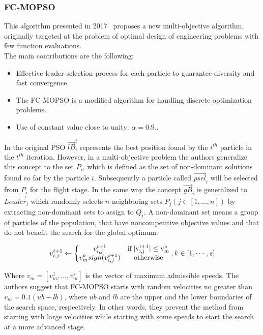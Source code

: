 \subsubsection{FC-MOPSO}

This algorithm presented in 2017~\cite{mokarram2018new} proposes a new multi-objective algorithm, originally targeted at the problem of optimal design of engineering problems with few function evaluations.\\
The main contributions are the following:
\begin{itemize}
    \item Effective leader selection process for each particle to guarantee diversity and fast convergence.
    \item The FC-MOPSO is a modified algorithm for handling discrete optimization problems.
    \item Use of constant value close to unity: $\alpha = 0.9.$.
\end{itemize}
In the original PSO $\vec{lB}_i^t$ represents the best position found by the $i^{th}$ particle in the $t^{th}$ iteration. However, in a multi-objective problem the authors generalize this concept to the set $P_i$, which is defined as the set of non-dominant solutions found so far by the particle $i$. Subsequently a particle called $\vec{psel}_i$ will be selected from $P_i$ for the flight stage. In the same way the concept $\vec{gB}_i$ is generalized to $\vec{Leader}_i$ which randomly selects $n$ neighboring sets $P_j (j\in[1,...,n])$ by extracting non-dominant sets to assign to $Q_i$. A non-dominant set means a group of particles of the population, that have noncompetitive objective values and that do not benefit the search for the global optimum.

\begin{equation}
    v_{i,j}^{t+1} \leftarrow \left\{  \begin{matrix} v_{i,j}^{t+1} & \rm{ if} \, |v_{i,j}^{t+1}| \leq v_m^k \\ v_m^k sign ( v_{i,j}^{t+1} ) & \rm{otherwise} \end{matrix} \right. , k \in [1, \cdots,s]
\end{equation}

Where $v_m = [v_m^1, \dots, v_m^s]$ is the vector of maximum admissible speeds. The authors suggest that FC-MOPSO starts with random velocities no greater than $v_{m} = 0.1(ub - lb)$, where $ub$ and $lb$ are the upper and the lower boundaries of the search space, respectively. In other words, they prevent the method from starting with large velocities while starting with some speeds to start the search at a more advanced stage. 

